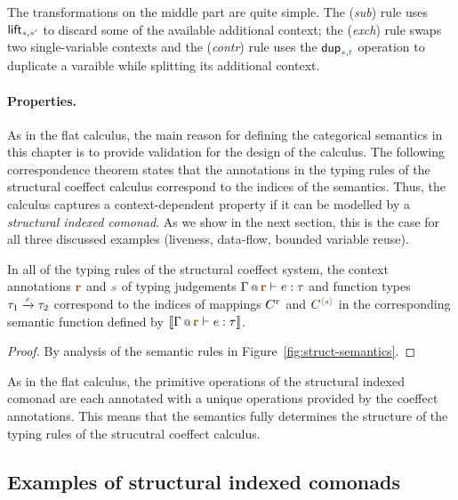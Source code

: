 The transformations on the middle part are quite simple. The (\emph{sub}) rule 
uses $\ident{lift}_{\cclrd{s}, \cclrd{s'}}$ to discard some of the available additional context;
the (\emph{exch}) rule swaps two single-variable contexts and the (\emph{contr}) rule
uses the $\ident{dup}_{\cclrd{s}, \cclrd{t}}$ operation to duplicate a varaible while 
splitting its additional context.

\paragraph{Properties.}

As in the flat calculus, the main reason for defining the categorical semantics in this chapter
is to provide validation for the design of the calculus. The following correspondence theorem
states that the annotations in the typing rules of the structural coeffect calculus correspond 
to the indices of the semantics. Thus, the calculus captures a context-dependent property if
it can be modelled by a \emph{structural indexed comonad}. As we show in the next section, 
this is the case for all three discussed examples (liveness, data-flow, bounded variable reuse).

\begin{theorem}[Correspondence]
In all of the typing rules of the structural coeffect system, the context annotations $\aclrd{\textbf{r}}$ 
and $\cclrd{s}$ of typing judgements $\coctx{\Gamma}{\aclrd{\textbf{r}}} \vdash e : \tau$ and function types 
$\tau_1 \xrightarrow{\cclrd{s}} \tau_2$  correspond to the indices of mappings $\ctyp{\aclrd{\textbf{r}}}{}$ 
and $\ctyp{\alift{\cclrd{s}}}{}$ in the corresponding semantic function defined 
by $\sem{\coctx{\Gamma}{\aclrd{\textbf{r}}} \vdash e : \tau}$.
\end{theorem}
\begin{proof}
By analysis of the semantic rules in Figure~\ref{fig:struct-semantics}.
\end{proof}

\noindent
As in the flat calculus, the primitive operations of the structural indexed comonad are each
annotated with a unique operations provided by the coeffect annotations. This means that the
semantics fully determines the structure of the typing rules of the strucutral coeffect
calculus. 


\subsection{Examples of structural indexed comonads}
\label{sec:struct-semantics-examples}

